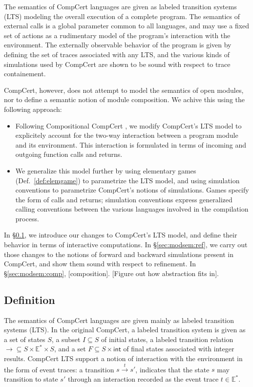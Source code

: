 \documentclass[acmsmall,timestamp,review,anonymous]{acmart}
\newcommand{\kw}[1]{\ensuremath{ \mathsf{#1} }}
\begin{document}
The semantics of CompCert languages
are given as labeled transition systems (LTS)
modeling the overall execution of a complete program.
The semantics of external calls
is a global parameter common to all languages,
and may use a fixed set of actions as a rudimentary model
of the program's interaction with the environment.
The externally observable behavior of the program
is given by defining the set of traces associated with any LTS,
and the various kinds of simulations used by CompCert
are shown to be sound with respect to trace containement.

CompCert, however,
does not attempt to model the semantics of open modules,
nor to define a semantic notion of module composition.
We achive this using the following approach:
\begin{itemize}
\item Following Compositional CompCert \cite{compcompcert},
  we modify CompCert's LTS model
  to explicitely account for the two-way interaction
  between a program module and its environment.
  This interaction is formulated
  in terms of incoming and outgoing function calls and returns.
\item We generalize this model further by
  using elementary games (Def.~\ref{def:elemgame})
  to parametrize the LTS model, and
  using simulation conventions to parametrize
  CompCert's notions of simulations.
  Games specify the form of calls and returns;
  simulation conventions express
  generalized calling conventions between the various
  languages involved in the compilation process.
\end{itemize}

In \S\ref{sec:modsem:def},
we introduce our changes to CompCert's LTS model,
and define their behavior in terms of interactive computations.
In \S\ref{sec:modsem:ref},
we carry out those changes to the notions of
forward and backward simulations
present in CompCert,
and show them sound with respect to refinement.
In \S\ref{sec:modsem:comp},
[composition].
[Figure out how abstraction fits in].


\subsection{Definition} %
\label{sec:modsem:def}

The semantics of CompCert languages are given mainly
as labeled transition systems (LTS).
In the original CompCert,
a labeled transition system is given as
a set of states $S$,
a subset $I \subseteq S$ of initial states,
a labeled transition relation
${\rightarrow} \subseteq S \times \mathbb{E}^* \times S$,
and a set
$F \subseteq S \times \kw{int}$
of final states associated with integer results.
CompCert LTS support a notion of interaction with the environment
in the form of event traces:
a transition $s \stackrel{t}{\rightarrow} s'$,
indicates that the state $s$ may transition to state $s'$
through an interaction recorded as the event trace $t \in \mathbb{E}^*$.
\end{document}
